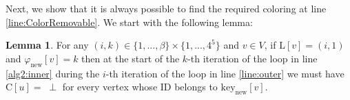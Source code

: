 \documentclass{article}
\theoremstyle{definition}
\newtheorem{lemma}{Lemma}[section]
\def\shiri#1{\textcolor{red}{[Shiri: #1]}}
\begin{document}
Next, we show that it is always possible to find the required coloring at line \ref{line:ColorRemovable}. We start with the following lemma:


\begin{lemma} For any $(i,k) \in \{1, ..., \beta\} \times \{1, ..., 4^5\}$ and $v \in V$, if $\text{L}[v] = (i,1)$ and $\varphi_{\text{new}}[v] = k$ then at the start of the $k$-th iteration of the loop in line \ref{alg2:inner} during the $i$-th iteration of the loop in line \ref{line:outer} we must have $\text{C}[u] = \; \perp$ for every vertex whose ID belongs to $\text{key}_{\text{new}}[v]$.
\label{lem:uncoloredCycle}\end{lemma}
\end{document}
